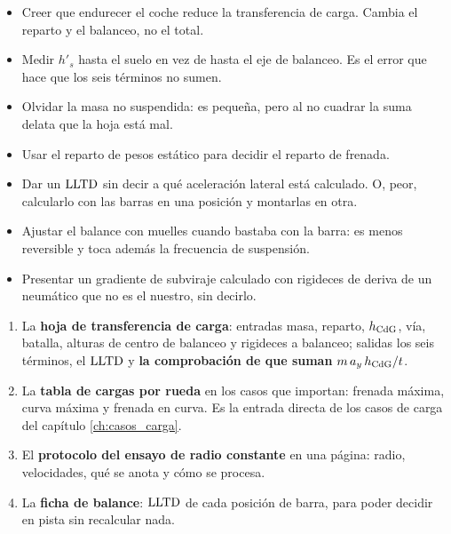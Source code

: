 \begin{ojo}
\begin{itemize}
  \item Creer que endurecer el coche reduce la transferencia de carga. Cambia
        el reparto y el balanceo, no el total.
  \item Medir $h'_s$ hasta el suelo en vez de hasta el eje de balanceo. Es el
        error que hace que los seis términos no sumen.
  \item Olvidar la masa no suspendida: es pequeña, pero al no cuadrar la suma
        delata que la hoja está mal.
  \item Usar el reparto de pesos estático para decidir el reparto de frenada.
  \item Dar un $\mathrm{LLTD}$ sin decir a qué aceleración lateral está calculado. O,
        peor, calcularlo con las barras en una posición y montarlas en otra.
  \item Ajustar el balance con muelles cuando bastaba con la barra: es menos
        reversible y toca además la frecuencia de suspensión.
  \item Presentar un gradiente de subviraje calculado con rigideces de deriva
        de un neumático que no es el nuestro, sin decirlo.
\end{itemize}
\end{ojo}

\begin{entregable}
\begin{enumerate}
  \item La \textbf{hoja de transferencia de carga}: entradas masa, reparto,
        $h_{\mathrm{CdG}}$, vía, batalla, alturas de centro de balanceo y rigideces a
        balanceo; salidas los seis términos, el $\mathrm{LLTD}$ y \textbf{la
        comprobación de que suman} $m\,a_y\,h_{\mathrm{CdG}}/t$.
  \item La \textbf{tabla de cargas por rueda} en los casos que importan:
        frenada máxima, curva máxima y frenada en curva. Es la entrada directa
        de los casos de carga del capítulo \ref{ch:casos_carga}.
  \item El \textbf{protocolo del ensayo de radio constante} en una página:
        radio, velocidades, qué se anota y cómo se procesa.
  \item La \textbf{ficha de balance}: $\mathrm{LLTD}$ de cada posición de barra, para
        poder decidir en pista sin recalcular nada.
\end{enumerate}
\end{entregable}

